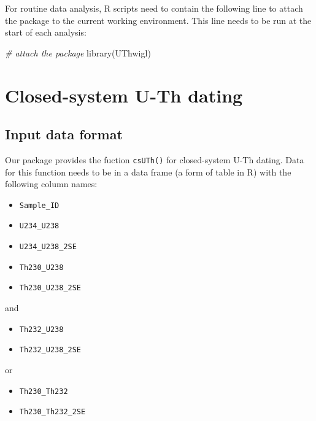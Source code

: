 \documentclass[]{elsarticle} %
\providecommand{\tightlist}{%
  \setlength{\itemsep}{0pt}\setlength{\parskip}{0pt}}
\newenvironment{Shaded}{\begin{snugshade}}{\end{snugshade}}
\newcommand{\CommentTok}[1]{\textcolor[rgb]{0.56,0.35,0.01}{\textit{#1}}}
\newcommand{\FunctionTok}[1]{\textcolor[rgb]{0.00,0.00,0.00}{#1}}
\newcommand{\NormalTok}[1]{#1}
\begin{document}
For routine data analysis, R scripts need to contain the following line to attach the package to the current working environment. This line needs to be run at the start of each analysis:

\begin{Shaded}
\begin{Highlighting}[]
\CommentTok{\# attach the package}
\FunctionTok{library}\NormalTok{(UThwigl)}
\end{Highlighting}
\end{Shaded}

\newpage

\hypertarget{closed-system-u-th-dating}{%
\section{Closed-system U-Th dating}\label{closed-system-u-th-dating}}

\hypertarget{input-data-format}{%
\subsection{Input data format}\label{input-data-format}}

Our package provides the fuction \texttt{csUTh()} for closed-system U-Th dating. Data for this function needs to be in a data frame (a form of table in R) with the following column names:

\begin{itemize}
\tightlist
\item
  \texttt{Sample\_ID}
\item
  \texttt{U234\_U238}
\item
  \texttt{U234\_U238\_2SE}
\item
  \texttt{Th230\_U238}
\item
  \texttt{Th230\_U238\_2SE}
\end{itemize}

and

\begin{itemize}
\tightlist
\item
  \texttt{Th232\_U238}
\item
  \texttt{Th232\_U238\_2SE}
\end{itemize}

or

\begin{itemize}
\tightlist
\item
  \texttt{Th230\_Th232}
\item
  \texttt{Th230\_Th232\_2SE}
\end{itemize}
\end{document}
